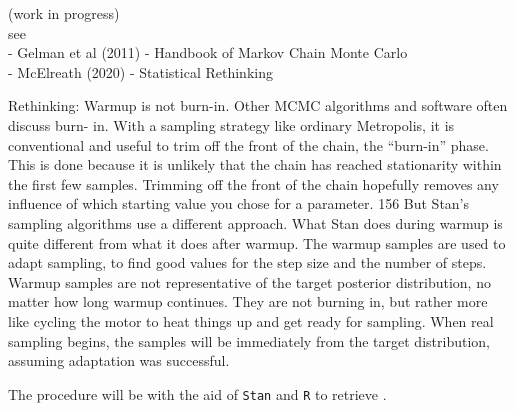 {\color{red} (work in progress) \\
	see \\
	- Gelman et al (2011) - Handbook of Markov Chain Monte Carlo\\
	- McElreath (2020) - Statistical Rethinking
	
	Rethinking: Warmup is not burn-in. Other MCMC algorithms and software often discuss burn-
	in. With a sampling strategy like ordinary Metropolis, it is conventional and useful to trim off the
	front of the chain, the “burn-in” phase. This is done because it is unlikely that the chain has reached
	stationarity within the first few samples. Trimming off the front of the chain hopefully removes any
	influence of which starting value you chose for a parameter. 156
	But Stan’s sampling algorithms use a different approach. What Stan does during warmup is quite
	different from what it does after warmup. The warmup samples are used to adapt sampling, to find
	good values for the step size and the number of steps. Warmup samples are not representative of
	the target posterior distribution, no matter how long warmup continues. They are not burning in,
	but rather more like cycling the motor to heat things up and get ready for sampling. When real
	sampling begins, the samples will be immediately from the target distribution, assuming adaptation
	was successful.
	
}


The procedure will be with the aid of \texttt{Stan} \cite{Stan2020} and \texttt{R} \cite{R2015, RStan2020} to retrieve . \\


